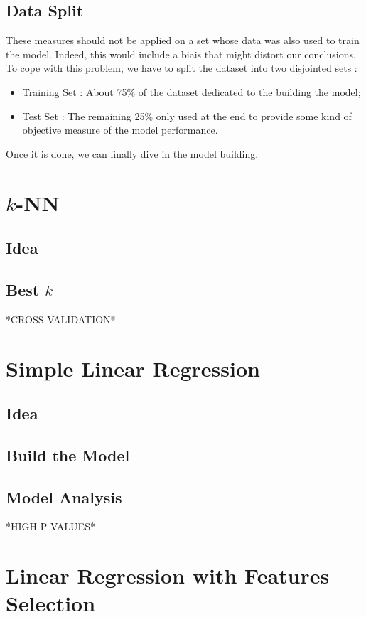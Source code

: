 \documentclass[]{report}
\begin{document}
\subsection{Data Split}
These measures should not be applied on a set whose data was also used to train the model. Indeed, this would include a biais that might distort our conclusions. To cope with this problem, we have to split the dataset into two disjointed sets : 
\begin{itemize}
	\item Training Set : About 75\% of the dataset dedicated to the building the model;
	\item Test Set : The remaining 25\% only used at the end to provide some kind of objective measure of the model performance.
\end{itemize} 

Once it is done, we can finally dive in the model building.

\section{$k$-NN}
\subsection{Idea}

\subsection{Best $k$}
*CROSS VALIDATION*

\section{Simple Linear Regression}
\subsection{Idea}

\subsection{Build the Model} 

\subsection{Model Analysis}
*HIGH P VALUES*

\section{Linear Regression with Features Selection}
\end{document}
